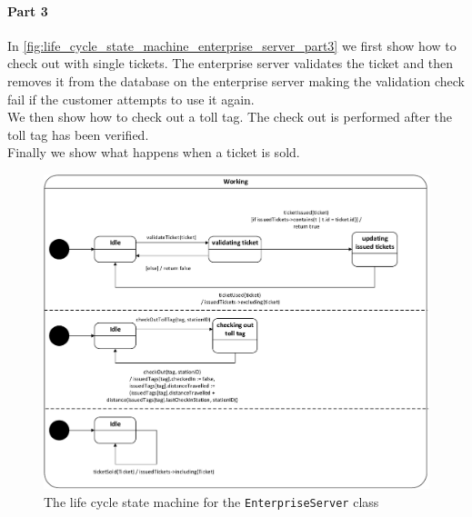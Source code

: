 \paragraph*{Part 3} In \autoref{fig:life_cycle_state_machine_enterprise_server_part3} we first show how to check out with single tickets. The enterprise server validates the ticket and then removes it from the database on the enterprise server making the validation check fail if the customer attempts to use it again.
\\
We then show how to check out a toll tag. The check out is performed after the toll tag has been verified.
\\
Finally we show what happens when a ticket is sold.

\begin{figure}[H]
\centering
\includegraphics[width=0.7\linewidth]{img/behaviour_state_machines/life_cycle_state_machines/life_cycle_state_machine_enterprise_server_part3}
\caption{The life cycle state machine for the \texttt{EnterpriseServer} class}
\label{fig:life_cycle_state_machine_enterprise_server_part3}
\end{figure}